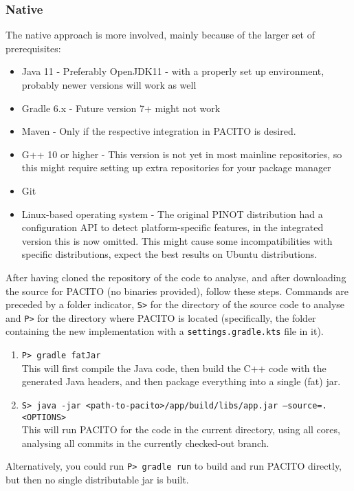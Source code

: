 \subsubsection{Native}
The native approach is more involved, mainly because of the larger set of prerequisites:
\begin{itemize}
    \item Java 11 - Preferably OpenJDK11 - with a properly set up environment, probably newer versions will work as well
    \item Gradle 6.x - Future version 7+ might not work
    \item Maven - Only if the respective integration in PACITO is desired.
    \item G++ 10 or higher - This version is not yet in most mainline repositories, so this might require setting up extra repositories for your package manager
    \item Git
    \item Linux-based operating system - The original PINOT distribution had a configuration API to detect platform-specific features, in the integrated version this is now omitted. This might cause some incompatibilities with specific distributions, expect the best results on Ubuntu distributions.
\end{itemize}

After having cloned the repository of the code to analyse, and after downloading the source for PACITO (no binaries provided), follow these steps. Commands are preceded by a folder indicator, {\tt S>} for the directory of the source code to analyse and {\tt P>} for the directory where PACITO is located (specifically, the folder containing the new implementation with a {\tt settings.gradle.kts} file in it).
\begin{enumerate}[label=\bf\arabic*)]
    \item {\tt P> gradle fatJar} \\ This will first compile the Java code, then build the C++ code with the generated Java headers, and then package everything into a single (fat) jar.
    \item {\tt S> java -jar <path-to-pacito>/app/build/libs/app.jar --source=. <OPTIONS>} \\ This will run PACITO for the code in the current directory, using all cores, analysing all commits in the currently checked-out branch.
\end{enumerate}

Alternatively, you could run {\tt P> gradle run} to build and run PACITO directly, but then no single distributable jar is built.

